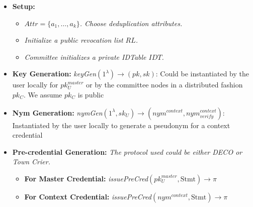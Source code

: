 \begin{itemize}
\item \textbf{Setup:}
       \begin{itemize}
            \item \textit{$Attr = \{a_1, \ldots, a_k\}$. Choose deduplication attributes.}
            \item \textit{Initialize a public revocation list $RL$.}
            \item \textit{Committee initializes a private IDTable $IDT$.}
        \end{itemize}
\end{itemize}

\begin{itemize}
\item \textbf{Key Generation:} \textit{keyGen$(1^\lambda) \rightarrow (pk, sk)$}:  Could be instantiated by the user locally for $pk_U^{master}$ or by the committee nodes in a distributed fashion $pk_C$. We assume $pk_C$ is public
\end{itemize}

\begin{itemize}
\item \textbf{Nym Generation:} \textit{nymGen$(1^\lambda, sk_U) \rightarrow (nym^{context}, nym^{context}_{verify})$}: Instantiated by the user locally to generate a pseudonym for a context credential
\end{itemize}


\begin{itemize}
\item \textbf{Pre-credential Generation:} \textit{The protocol used could be either DECO or Town Crier.}
    \begin{itemize}
    \item \textbf{For Master Credential:} \textit{issuePreCred$(pk_U^{master}, \text{Stmt}) \rightarrow \pi$}
    \item \textbf{For Context Credential:} \textit{issuePreCred$(nym^{context}, \text{Stmt}) \rightarrow \pi$}
    \end{itemize}
\end{itemize}

